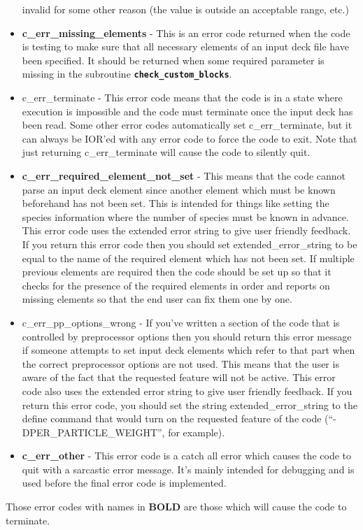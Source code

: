 \documentclass[12pt,a4paper]{article}
\newcommand{\inlinecode}[1]{{\color{warwickred} \bf\texttt{#1}}}
\begin{document}
\begin{itemize}
  invalid for some other reason (the value is outside an acceptable range, etc.)
\item {\bf c\_err\_missing\_elements} - This is an error code returned when the
  code is testing to make sure that all necessary elements of an input deck
  file have been specified. It should be returned when some required parameter
  is missing in the subroutine \inlinecode{check\_custom\_blocks}.
\item c\_err\_terminate - This error code means that the code is in a state
  where execution is impossible and the code must terminate once the input deck
  has been read. Some other error codes automatically set c\_err\_terminate,
  but it can always be IOR'ed with any error code to force the code to exit.
  Note that just returning c\_err\_terminate will cause the code to
  silently quit.
\item {\bf c\_err\_required\_element\_not\_set} - This means that the code
  cannot parse an input deck element since another element which must be known
  beforehand has not been set. This is intended for things like setting the
  species information where the number of species must be known in
  advance. This error code uses the extended error string to give user friendly
  feedback. If you return this error code then you should set
  extended\_error\_string to be equal to the name of the required element which
  has not been set. If multiple previous elements are required then the code
  should be set up so that it checks for the presence of the required elements
  in order and reports on missing elements so that the end user can fix them
  one by one.
\item c\_err\_pp\_options\_wrong - If you've written a section of the code that
  is controlled by preprocessor options then you should return this
  error message if someone attempts to set input deck elements which refer to
  that part when the correct preprocessor options are not used. This means that
  the user is aware of the fact that the requested feature will not be
  active. This error code also uses the extended error string to give user
  friendly feedback. If you return this error code, you should set the string
  extended\_error\_string to the define command that would turn on the
  requested feature of the code (``-DPER\_PARTICLE\_WEIGHT'', for example).
\item {\bf c\_err\_other} - This error code is a catch all error which causes
  the code to quit with a sarcastic error message. It's mainly intended for
  debugging and is used before the final error code is implemented.
\end{itemize}

Those error codes with names in {\bf BOLD} are those which will cause the code
to terminate.
\end{document}

